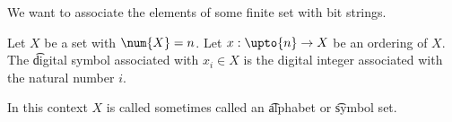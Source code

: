 

We want to associate the elements of some finite set with bit strings.


Let $X$ be a set with $\num{X} = n$.
Let $x: \upto{n} \to X$ be an ordering of $X$.
The \t{digital symbol} associated with $x_i \in X$ is the digital integer associated with the natural number $i$.

In this context $X$ is called sometimes called an \t{alphabet} or \t{symbol set}.

\blankpage
